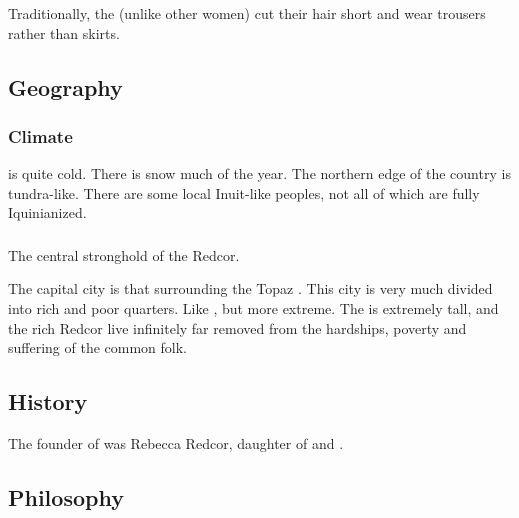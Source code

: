 Traditionally, the \Ryzin{} (unlike other \Redcean{} women) cut their hair short and wear trousers rather than skirts. 









\subsection{Geography}





\subsubsection{Climate}
\Redce{} is quite cold. 
There is snow much of the year. 
The northern edge of the country is tundra-like. 
There are some local Inuit-like peoples, not all of which are fully Iquinianized. 





\subsubsection{\TopazChateau}
\index{\TopazChateau}
The central stronghold of the Redcor. 

The capital city is that surrounding the Topaz \Chateau. This city is very much divided into rich and poor quarters. Like , but more extreme. The \Chateau{} is extremely tall, and the rich Redcor live infinitely far removed from the hardships, poverty and suffering of the common folk. 









\subsection{History}
The founder of \ClanRedcor was Rebecca Redcor, daughter of  and . 









\subsection{Philosophy}






